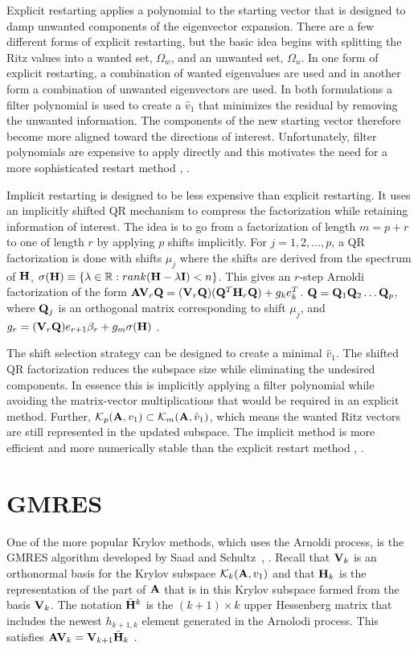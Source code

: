 Explicit restarting applies a polynomial to the starting vector that is designed to damp unwanted components of the eigenvector expansion. There are a few different forms of explicit restarting, but the basic idea begins with splitting the Ritz values into a wanted set, $\Omega_w$, and an unwanted set, $\Omega_u$. In one form of explicit restarting, a combination of wanted eigenvalues are used and in another form a combination of unwanted eigenvectors are used. In both formulations a filter polynomial is used to create a $\hat{v}_1$ that minimizes the residual by removing the unwanted information. The components of the new starting vector therefore become more aligned toward the directions of interest. Unfortunately, filter polynomials are expensive to apply directly and this motivates the need for a more sophisticated restart method \cite{Sorensen1996}, \cite{Stewart2001}.

Implicit restarting is designed to be less expensive than explicit restarting. It uses an implicitly shifted QR mechanism to compress the factorization while retaining information of interest. The idea is to go from a factorization of length $m = p + r$ to one of length $r$ by applying $p$ shifts implicitly. For $j = 1,2,\dots,p$, a QR factorization is done with shifts $\mu_j$ where the shifts are derived from the spectrum of $\mathbf{H}$, $\sigma(\mathbf{H}) \equiv \{\lambda \in \mathbb{R}: rank(\mathbf{H} - \lambda \mathbf{I}) < n\}$. This gives an $r$-step Arnoldi factorization of the form $\mathbf{AV}_r \mathbf{Q} = (\mathbf{V}_r \mathbf{Q})(\mathbf{Q}^T \mathbf{H}_r \mathbf{Q}) + g_k e^T_k$. $\mathbf{Q} = \mathbf{Q}_1 \mathbf{Q}_2 \dots \mathbf{Q}_p$, where $\mathbf{Q}_j$ is an orthogonal matrix corresponding to shift $\mu_j$, and $g_r = (\mathbf{V}_r \mathbf{Q}) e_{r+1} \beta_r + g_m \sigma(\mathbf{H})$ \cite{Sorensen1996}.

The shift selection strategy can be designed to create a minimal $\hat{v}_1$. The shifted QR factorization reduces the subspace size while eliminating the undesired components. In essence this is implicitly applying a filter polynomial while avoiding the matrix-vector multiplications that would be required in an explicit method. Further, $\mathcal{K}_p(\mathbf{A},v_1) \subset \mathcal{K}_m(\mathbf{A}, \hat{v}_1)$, which means the wanted Ritz vectors are still represented in the updated subspace. The implicit method is more efficient and more numerically stable than the explicit restart method \cite{Sorensen1996}, \cite{Stewart2001}.

\section{GMRES}
One of the more popular Krylov methods, which uses the Arnoldi process, is the GMRES algorithm developed by Saad and Schultz~\cite{Saad1986}, \cite{Knoll2004}. Recall that $\mathbf{V}_{k}$ is an orthonormal basis for the Krylov subspace $\mathcal{K}_{k}(\mathbf{A}, v_1)$ and that $\mathbf{H}_{k}$ is the representation of the part of $\mathbf{A}$ that is in this Krylov subspace formed from the basis $\mathbf{V}_{k}$. The notation $\bar{\mathbf{H}}^{k}$ is the $(k+1) \times k$ upper Hessenberg matrix that includes the newest $h_{k+1,k}$ element generated in the Arnolodi process. This satisfies $\mathbf{AV}_{k} = \mathbf{V}_{k+1}\bar{\mathbf{H}}_{k}$ \cite{Saad1986}. 


